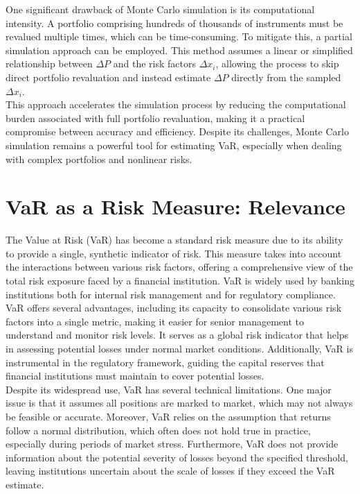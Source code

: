 \documentclass[a4paper,10pt]{article}
\begin{document}
\noindent One significant drawback of Monte Carlo simulation is its computational intensity. A portfolio comprising hundreds of thousands of instruments must be revalued multiple times, which can be time-consuming. To mitigate this, a partial simulation approach can be employed. This method assumes a linear or simplified relationship between \(\Delta P\) and the risk factors \(\Delta x_i\), allowing the process to skip direct portfolio revaluation and instead estimate \(\Delta P\) directly from the sampled \(\Delta x_i\).\\

\noindent This approach accelerates the simulation process by reducing the computational burden associated with full portfolio revaluation, making it a practical compromise between accuracy and efficiency. Despite its challenges, Monte Carlo simulation remains a powerful tool for estimating VaR, especially when dealing with complex portfolios and nonlinear risks.\\


\section{VaR as a Risk Measure: Relevance}

\noindent The Value at Risk (VaR) has become a standard risk measure due to its ability to provide a single, synthetic indicator of risk. This measure takes into account the interactions between various risk factors, offering a comprehensive view of the total risk exposure faced by a financial institution. VaR is widely used by banking institutions both for internal risk management and for regulatory compliance.\\

\noindent VaR offers several advantages, including its capacity to consolidate various risk factors into a single metric, making it easier for senior management to understand and monitor risk levels. It serves as a global risk indicator that helps in assessing potential losses under normal market conditions. Additionally, VaR is instrumental in the regulatory framework, guiding the capital reserves that financial institutions must maintain to cover potential losses.\\

\noindent Despite its widespread use, VaR has several technical limitations. One major issue is that it assumes all positions are marked to market, which may not always be feasible or accurate. Moreover, VaR relies on the assumption that returns follow a normal distribution, which often does not hold true in practice, especially during periods of market stress. Furthermore, VaR does not provide information about the potential severity of losses beyond the specified threshold, leaving institutions uncertain about the scale of losses if they exceed the VaR estimate.\\
\end{document}

